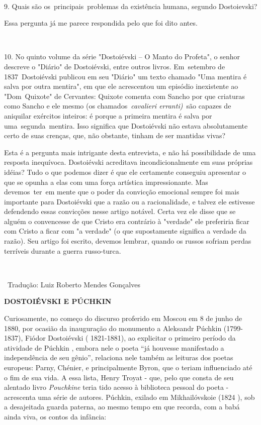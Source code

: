 ~

9. Quais são os~principais~problemas da existência humana, segundo
Dostoievski?

Essa pergunta já me parece respondida pelo que foi dito antes.

~

10. No quinto volume da série "Dostoiévski -- O Manto do Profeta", o
senhor descreve o "Diário" de Dostoiévski, entre outros livros.
Em~setembro de 1837~Dostoiévski publicou em seu "Diário" um texto
chamado "Uma mentira é salva por outra mentira", em que ele acrescentou
um episódio inexistente ao "Dom~Quixote" de Cervantes: Quixote comenta
com Sancho por que criaturas como Sancho e ele mesmo (os
chamados~\emph{cavalieri erranti)~}são capazes de aniquilar exércitos
inteiros: é porque a primeira mentira é salva por uma~segunda~mentira.
Isso significa que Dostoiévski não estava absolutamente certo de suas
crenças, que, não obstante, tinham de ser mantidas vivas?

Esta é a pergunta mais intrigante desta entrevista, e não há
possibilidade de uma resposta inequívoca. Dostoiévski acreditava
incondicionalmente em suas próprias idéias? Tudo o que podemos dizer é
que ele certamente conseguiu apresentar o que se opunha a elas com uma
força artística impressionante. Mas devemos~ter~em mente que o poder da
convicção emocional sempre foi mais importante para Dostoiévski que a
razão ou a racionalidade, e talvez ele estivesse defendendo essas
convicções nesse artigo notável. Certa vez ele disse que se alguém o
convencesse de que Cristo era contrário à "verdade" ele preferiria ficar
com Cristo a ficar com "a verdade" (o que supostamente significa a
verdade da razão). Seu artigo foi escrito, devemos lembrar, quando os
russos sofriam perdas terríveis durante a guerra russo-turca.

~

~Tradução: Luiz Roberto Mendes Gonçalves

\textbf{DOSTOIÉVSKI E PÚCHKIN}

Curiosamente, no começo do discurso proferido em Moscou em 8 de junho de
1880, por ocasião da inauguração do monumento a Aleksandr Púchkin
(1799-1837), Fiódor Dostoiévski ( 1821-1881), ao explicitar o primeiro
período da atividade de Púchkin , embora nele o poeta ``já houvesse
manifestado a independência de seu gênio'', relaciona nele também as
leituras dos poetas europeus: Parny, Chénier, e principalmente Byron,
que o teriam influenciado até o fim de sua vida. A essa lista, Henry
Troyat - que, pelo que consta de seu alentado livro \emph{Pouchkine}
teria tido acesso à biblioteca pessoal do poeta - acrescenta uma série
de autores. Púchkin, exilado em Mikhailóvskoie (1824 ), sob a
desajeitada guarda paterna, ao mesmo tempo em que recorda, com a babá
ainda viva, os contos da infância:

